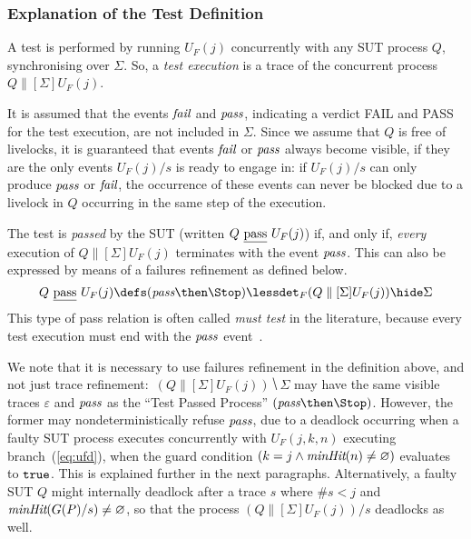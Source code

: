 \subsubsection*{Explanation of the Test Definition}
A test is performed by running $U_F(j)$ concurrently with any SUT process
$Q$, synchronising over $\Sigma$. So, a \emph{test execution} is a trace of the
concurrent process
$Q\parallel[\Sigma] U_F(j)$.

It is assumed that the events ${\text{\it fail}}$ and ${\text{\it pass}}$, indicating a verdict
FAIL and PASS for the test execution, are not included in $\Sigma$. Since we
assume that $Q$ is free of livelocks, it is guaranteed that events ${\text{\it fail}}$
or ${\text{\it pass}}$ always become visible, if they are the only events $U_F(j)/s$ is
ready to engage in: if $U_F(j)/s$ can only produce ${\text{\it pass}}$ or ${\text{\it fail}}$, the
occurrence of these events can never be blocked due to a livelock in $Q$
occurring in the same step of the execution.


The test is \emph{passed} by the SUT (written $Q\ \underline{\text{pass}}\ U_F(j)$) if, and
only if, {\it every} execution of $Q\parallel[\Sigma] U_F(j)$ terminates with
the event ${\text{\it pass}}$. This can also be  expressed by means of a failures
refinement as defined below.
%
\begin{equation}
\label{eq:passF}
Q\ \pass\ U_F(j) \defs (\epass\then\Stop) \lessdet_F (Q\parallel[\Sigma] U_F(j)) \hide \Sigma
\end{equation}
%
This type of pass relation is often called \emph{must test} in the
literature, because every test execution must end with the ${\text{\it pass}}$
event~\cite{Hennessy:1988:ATP:50497}.

We note that it is necessary to use failures refinement in the definition
above, and not just trace refinement:~$(Q\parallel[\Sigma] U_F(j)) \hide
\Sigma$ may have the same visible traces $\varepsilon$ and ${\text{\it pass}}$ as the
``Test Passed Process'' $(\epass\then\Stop)$. However, the former may
nondeterministically refuse ${\text{\it pass}}$, due to a deadlock occurring when a
faulty SUT process executes concurrently with $U_F(j,k,n)$ executing
branch~(\ref{eq:ufd}), when the guard condition $(k = j\wedge
\text{\it minHit}(n)\neq\varnothing)$ evaluates to $\mbox{{\tt true}}$. This is explained further
in the next paragraphs. Alternatively, a faulty SUT $Q$ might internally
deadlock after a trace $s$ where $\#s < j$ and $\text{\it minHit}(G(P)/s) \neq
\varnothing$, so that the process $(Q\parallel[\Sigma] U_F(j))/s$ deadlocks
as well.

